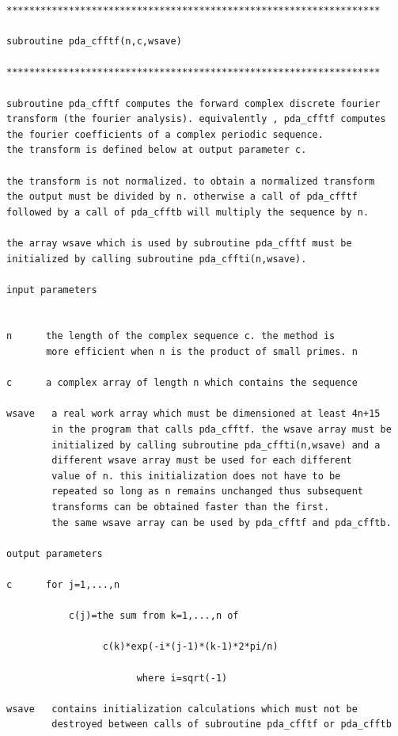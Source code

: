 \documentclass[11pt,twoside]{article}
\begin{document}
\begin{verbatim}
******************************************************************

subroutine pda_cfftf(n,c,wsave)

******************************************************************

subroutine pda_cfftf computes the forward complex discrete fourier
transform (the fourier analysis). equivalently , pda_cfftf computes
the fourier coefficients of a complex periodic sequence.
the transform is defined below at output parameter c.

the transform is not normalized. to obtain a normalized transform
the output must be divided by n. otherwise a call of pda_cfftf
followed by a call of pda_cfftb will multiply the sequence by n.

the array wsave which is used by subroutine pda_cfftf must be
initialized by calling subroutine pda_cffti(n,wsave).

input parameters


n      the length of the complex sequence c. the method is
       more efficient when n is the product of small primes. n

c      a complex array of length n which contains the sequence

wsave   a real work array which must be dimensioned at least 4n+15
        in the program that calls pda_cfftf. the wsave array must be
        initialized by calling subroutine pda_cffti(n,wsave) and a
        different wsave array must be used for each different
        value of n. this initialization does not have to be
        repeated so long as n remains unchanged thus subsequent
        transforms can be obtained faster than the first.
        the same wsave array can be used by pda_cfftf and pda_cfftb.

output parameters

c      for j=1,...,n

           c(j)=the sum from k=1,...,n of

                 c(k)*exp(-i*(j-1)*(k-1)*2*pi/n)

                       where i=sqrt(-1)

wsave   contains initialization calculations which must not be
        destroyed between calls of subroutine pda_cfftf or pda_cfftb
\end{verbatim}

\end{document}
